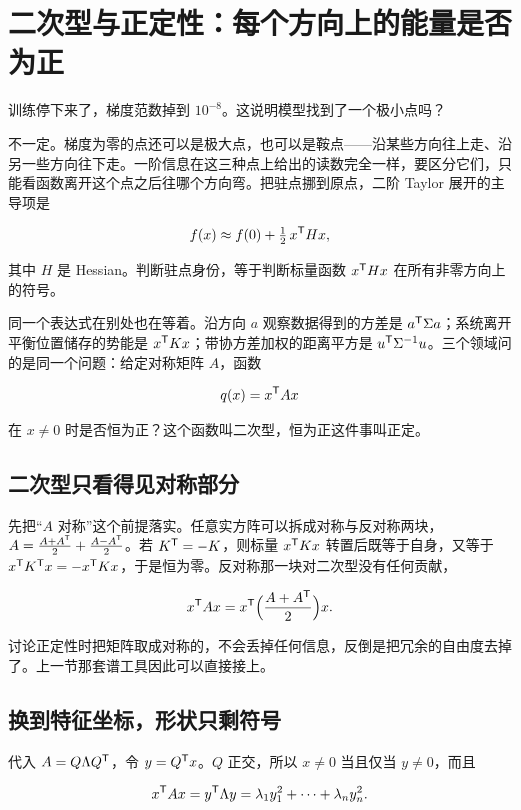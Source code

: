 \section{二次型与正定性：每个方向上的能量是否为正}
\label{sec:03-Linear-Algebra/06-Symmetric-and-Positive-Definite-Matrices/02}

训练停下来了，梯度范数掉到 \(10^{-8}\)。这说明模型找到了一个极小点吗？

不一定。梯度为零的点还可以是极大点，也可以是鞍点——沿某些方向往上走、沿另一些方向往下走。一阶信息在这三种点上给出的读数完全一样，要区分它们，只能看函数离开这个点之后往哪个方向弯。把驻点挪到原点，二阶 Taylor 展开的主导项是

\[
f(x)\approx f(0)+\tfrac12\,x^{\mathsf{T}}Hx,
\]

其中 \(H\) 是 Hessian。判断驻点身份，等于判断标量函数 \(x^{\mathsf{T}}Hx\) 在所有非零方向上的符号。

同一个表达式在别处也在等着。沿方向 \(a\) 观察数据得到的方差是 \(a^{\mathsf{T}}\Sigma a\)；系统离开平衡位置储存的势能是 \(x^{\mathsf{T}}Kx\)；带协方差加权的距离平方是 \(u^{\mathsf{T}}\Sigma^{-1}u\)。三个领域问的是同一个问题：给定对称矩阵 \(A\)，函数

\[
q(x)=x^{\mathsf{T}}Ax
\]

在 \(x\ne0\) 时是否恒为正？这个函数叫二次型，恒为正这件事叫正定。

\subsection{二次型只看得见对称部分}

先把``\(A\) 对称''这个前提落实。任意实方阵可以拆成对称与反对称两块，\(A=\frac{A+A^{\mathsf{T}}}2+\frac{A-A^{\mathsf{T}}}2\)。若 \(K^{\mathsf{T}}=-K\)，则标量 \(x^{\mathsf{T}}Kx\) 转置后既等于自身，又等于 \(x^{\mathsf{T}}K^{\mathsf{T}}x=-x^{\mathsf{T}}Kx\)，于是恒为零。反对称那一块对二次型没有任何贡献，

\[
x^{\mathsf{T}}Ax=x^{\mathsf{T}}\Bigl(\frac{A+A^{\mathsf{T}}}2\Bigr)x .
\]

讨论正定性时把矩阵取成对称的，不会丢掉任何信息，反倒是把冗余的自由度去掉了。上一节那套谱工具因此可以直接接上。

\subsection{换到特征坐标，形状只剩符号}

代入 \(A=Q\Lambda Q^{\mathsf{T}}\)，令 \(y=Q^{\mathsf{T}}x\)。\(Q\) 正交，所以 \(x\ne0\) 当且仅当 \(y\ne0\)，而且

\[
x^{\mathsf{T}}Ax=y^{\mathsf{T}}\Lambda y=\lambda_1y_1^2+\cdots+\lambda_ny_n^2 .
\]


